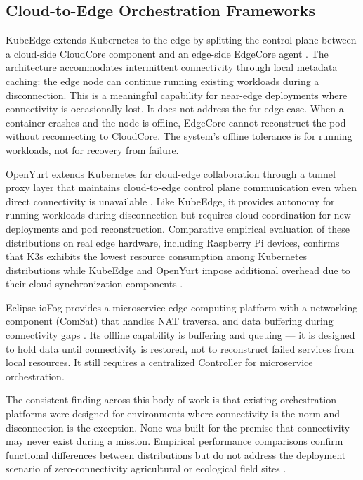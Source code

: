 \subsection{Cloud-to-Edge Orchestration Frameworks}
\label{sec:cloud_to_edge}
KubeEdge extends Kubernetes to the edge by splitting the control plane between a cloud-side CloudCore component and an edge-side EdgeCore agent \cite{xiong2018kubeedge}. The architecture accommodates intermittent connectivity through local metadata caching: the edge node can continue running existing workloads during a disconnection. This is a meaningful capability for near-edge deployments where connectivity is occasionally lost. It does not address the far-edge case. When a container crashes and the node is offline, EdgeCore cannot reconstruct the pod without reconnecting to CloudCore. The system's offline tolerance is for running workloads, not for recovery from failure.

OpenYurt extends Kubernetes for cloud-edge collaboration through a tunnel proxy layer that maintains cloud-to-edge control plane communication even when direct connectivity is unavailable \cite{yakubov2025comparative}. Like KubeEdge, it provides autonomy for running workloads during disconnection but requires cloud coordination for new deployments and pod reconstruction. Comparative empirical evaluation of these distributions on real edge hardware, including Raspberry Pi devices, confirms that K3s exhibits the lowest resource consumption among Kubernetes distributions while KubeEdge and OpenYurt impose additional overhead due to their cloud-synchronization components \cite{cilic2023performance}.

Eclipse ioFog provides a microservice edge computing platform with a networking component (ComSat) that handles NAT traversal and data buffering during connectivity gaps \cite{iofog2019eclipse}. Its offline capability is buffering and queuing — it is designed to hold data until connectivity is restored, not to reconstruct failed services from local resources. It still requires a centralized Controller for microservice orchestration.

The consistent finding across this body of work is that existing orchestration platforms were designed for environments where connectivity is the norm and disconnection is the exception. None was built for the premise that connectivity may never exist during a mission. Empirical performance comparisons confirm functional differences between distributions but do not address the deployment scenario of zero-connectivity agricultural or ecological field sites \cite{yakubov2025comparative, cilic2023performance}.
